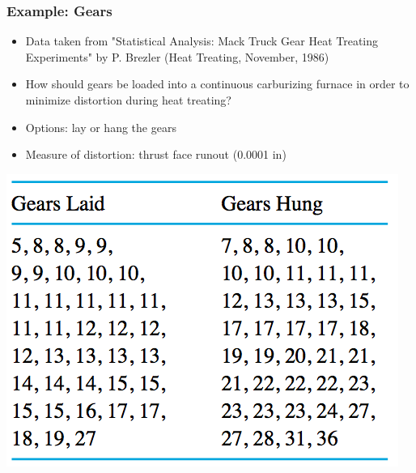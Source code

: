 \documentclass[handout]{beamer}
\numberwithin{equation}{section}
\begin{document}
\begin{frame}
\frametitle{Example: Gears} \scriptsize
\begin{itemize}
\item Data taken from "Statistical Analysis: Mack Truck Gear Heat Treating Experiments" by P. Brezler (Heat Treating, November, 1986) \pause
\item How should gears be loaded into a continuous carburizing furnace in order to minimize distortion during heat treating? \pause
\item Options: lay or hang the gears \pause
\item Measure of distortion: thrust face runout (0.0001 in)
\end{itemize}

\begin{center}
 \includegraphics{../../fig/gearstable.png} 
\end{center}

\end{frame}
\end{document}
